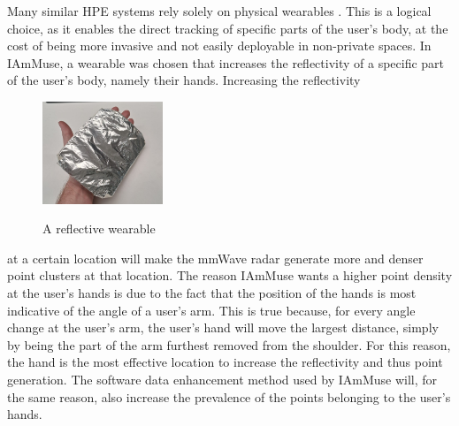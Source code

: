 Many similar HPE systems rely solely on physical wearables \cite{filippeshi2017survey, antonio2010the}. 
This is a logical choice, as it enables the direct tracking of specific parts of the user's body, at the cost of being more invasive and not easily deployable in non-private spaces.
In IAmMuse, a wearable was chosen that increases the reflectivity of a specific part of the user's body, namely their hands. Increasing the reflectivity
\begin{figure}
    \caption{A reflective wearable}
    \centering
    \includegraphics[width=0.32\textwidth]{figures/reflective wearable.png}
    \label{fig: reflective glove wearable}
\end{figure}
 at a certain location will make the mmWave radar generate more and denser point clusters at that location.
The reason IAmMuse wants a higher point density at the user's hands is due to the fact that the position of the hands is most indicative of the angle of a user's arm.
This is true because, for every angle change at the user's arm, the user's hand will move the largest distance, simply by being the part of the arm furthest removed from the shoulder.
For this reason, the hand is the most effective location to increase the reflectivity and thus point generation.
The software data enhancement method used by IAmMuse will, for the same reason, also increase the prevalence of the points belonging to the user's hands.





